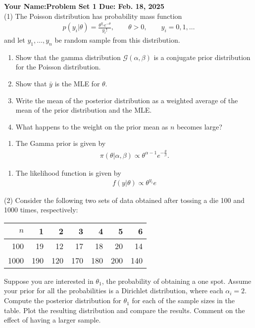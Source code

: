 \documentclass[final,11pt]{article}
\begin{document}
\thispagestyle{empty}
\begin{spacing}{1.25}

\textbf{Your Name:\hfill Problem Set 1 Due: Feb. 18, 2025}\\

(1) The Poisson distribution has probability mass function
\begin{gather}
    p(y_i|\theta)=\frac{\theta^{y_i}e^{-\theta}}{y_i!},\qquad \theta>0,\qquad y_i=0,1,\ldots
\end{gather}
and let $y_1,\ldots,y_n$ be random sample from this distribution.
\begin{enumerate}
    \item Show that the gamma distribution $\mathcal{G}(\alpha,\beta)$ is a conjugate prior distribution for the Poisson distribution.
    \item Show that $\bar{y}$ is the MLE for $\theta$.
    \item Write the mean of the posterior distribution as a weighted average of the mean of the prior distribution and the MLE.
    \item What happens to the weight on the prior mean as $n$ becomes large?
\end{enumerate}

\begin{enumerate}
    \item The Gamma prior is given by 
    \begin{gather}
    \pi(\theta|\alpha, \beta)\propto \theta^{\alpha-1}e^{-\frac{\theta}{\beta}}.
    \end{gather}
\end{enumerate}
    \begin{enumerate}
        \item The likelihood function is given by
        \begin{gather}
        f(y|\theta)\propto\theta^{y_i}e^{}
            
        \end{gather}
    \end{enumerate}
(2) Consider the following two sets of data obtained after tossing a die 100 and 1000 times, respectively:
\begin{center}
    \begin{tabular}{ r r r r r r r }
        \hline
        $n$ & 1 & 2 & 3 & 4 & 5 & 6 \\
        \hline
        100 & 19 & 12 & 17 & 18 & 20 & 14 \\  
        1000 & 190 & 120 & 170 & 180 & 200 & 140 \\
        \hline
    \end{tabular}
\end{center}
Suppose you are interested in $\theta_1$, the probability of obtaining a one spot. Assume your prior for all the probabilities is a Dirichlet distribution, where each $\alpha_i=2$. Compute the posterior distribution for $\theta_1$ for each of the sample sizes in the table. Plot the resulting distribution and compare the results. Comment on the effect of having a larger sample.

\end{spacing}
\end{document}
